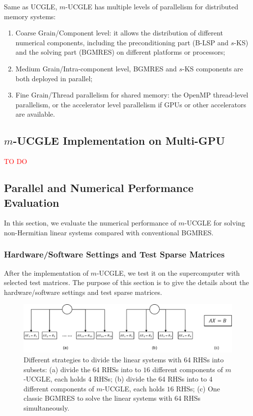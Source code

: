 Same as UCGLE, $m$-UCGLE has multiple levels of parallelism for distributed memory systems:

\begin{enumerate}
	\item Coarse Grain/Component level: it allows the distribution of different numerical components, including the preconditioning part (B-LSP and $s$-KS) and the solving part (BGMRES) on different platforms or processors;
	\item Medium Grain/Intra-component level, BGMRES and $s$-KS components are both deployed in parallel;
	\item Fine Grain/Thread parallelism for shared memory: the OpenMP thread-level parallelism, or the accelerator level parallelism if GPUs or other accelerators are available.
\end{enumerate} 

\subsection{$m$-UCGLE Implementation on Multi-GPU}

\textcolor{red}{TO DO}

\subsection{Parallel and Numerical Performance Evaluation}

In this section, we evaluate the numerical performance of $m$-UCGLE for solving non-Hermitian linear systems compared with conventional BGMRES.

\subsubsection{Hardware/Software Settings  and Test Sparse Matrices}\label{hardware}

After the implementation of $m$-UCGLE, we test it on the supercomputer with selected test matrices. The purpose of this section is to give the details about the hardware/software settings and test sparse matrices.

\begin{figure}[htbp]
	\centering
	\includegraphics[width=6.4in]{fig/alloc.pdf}
	\caption{Different strategies to divide the linear systems with 64 RHSs into subsets: (a) divide the 64 RHSs into to $16$ different components of $m$-UCGLE, each holds $4$ RHSs; (b) divide the 64 RHSs into to $4$ different components of $m$-UCGLE, each holds $16$ RHSs; (c) One classic BGMRES to solve the linear systems with 64 RHSs simultaneously.}
	\label{fig:alloc}
\end{figure}

